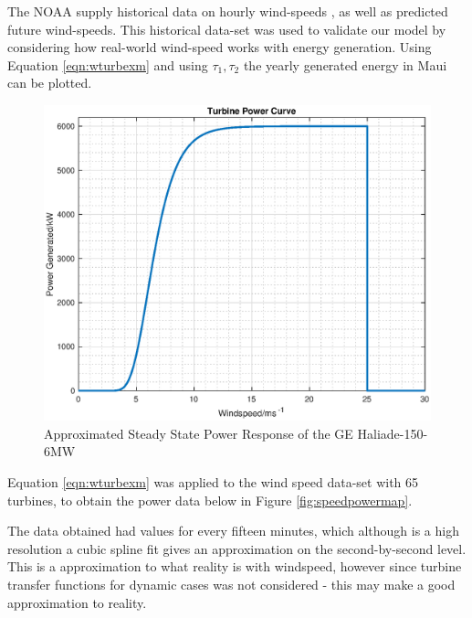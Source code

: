 The NOAA supply historical data on hourly wind-speeds \cite{power:NOAA}, as well as predicted future wind-speeds.
This historical data-set was used to validate our model by considering how real-world wind-speed works with energy generation.
Using Equation \ref{eqn:wturbexm} and using $\tau_1, \tau_2$ the yearly generated energy in Maui can be plotted.
           \begin{figure}[bht]
                   \centering
                   \includegraphics[scale=0.4]{./images/turbine.eps}
                   \caption{Approximated Steady State Power Response of the GE Haliade-150-6MW} \label{fig:wturb}
           \end{figure}

Equation \ref{eqn:wturbexm} was applied to the wind speed data-set with 65 turbines, to obtain the power data below in Figure \ref{fig:speedpowermap}.

The data obtained had values for every fifteen minutes, which although is a high resolution a cubic spline fit gives an approximation on the second-by-second level.
This is a approximation to what reality is with windspeed, however since turbine transfer functions for dynamic cases was not considered - this may make a good approximation to reality.

